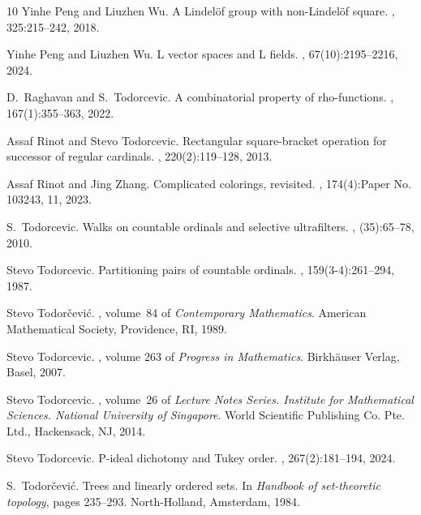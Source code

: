\documentclass{article}
\begin{document}
\begin{thebibliography}{10}
Yinhe Peng and Liuzhen Wu.
\newblock A {L}indel\"of group with non-{L}indel\"of square.
, 325:215--242, 2018.

Yinhe Peng and Liuzhen Wu.
\newblock L vector spaces and {L} fields.
, 67(10):2195--2216, 2024.

D.~Raghavan and S.~Todorcevic.
\newblock A combinatorial property of rho-functions.
, 167(1):355--363, 2022.

Assaf Rinot and Stevo Todorcevic.
\newblock Rectangular square-bracket operation for successor of regular
  cardinals.
, 220(2):119--128, 2013.

Assaf Rinot and Jing Zhang.
\newblock Complicated colorings, revisited.
, 174(4):Paper No. 103243, 11, 2023.

S.~Todorcevic.
\newblock Walks on countable ordinals and selective ultrafilters.
, (35):65--78, 2010.

Stevo Todorcevic.
\newblock Partitioning pairs of countable ordinals.
, 159(3-4):261--294, 1987.

Stevo Todor{\v{c}}evi{\'c}.
, volume~84 of {\em Contemporary
  Mathematics}.
\newblock American Mathematical Society, Providence, RI, 1989.

Stevo Todorcevic.
, volume 263 of {\em
  Progress in Mathematics}.
\newblock Birkh\"{a}user Verlag, Basel, 2007.

Stevo Todorcevic.
, volume~26 of {\em Lecture Notes
  Series. Institute for Mathematical Sciences. National University of
  Singapore}.
\newblock World Scientific Publishing Co. Pte. Ltd., Hackensack, NJ, 2014.

Stevo Todorcevic.
\newblock P-ideal dichotomy and {T}ukey order.
, 267(2):181--194, 2024.

S.~Todor\v{c}evi\'{c}.
\newblock Trees and linearly ordered sets.
\newblock In {\em Handbook of set-theoretic topology}, pages 235--293.
  North-Holland, Amsterdam, 1984.


\end{thebibliography}
\end{document}
